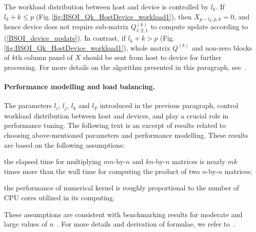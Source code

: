 \documentclass{llncs}
\begin{document}
The workload distribution between host and device is controlled by $l_k$. 
If $l_k + k \leq p$ (Fig.\,\ref{fig:BSOI_Qk_HostDevice_workload1}),
then $X_{p-l_k:p,k}=0$,
and hence device does not require sub-matrix $Q^{(k)}_{1:2,1}$
to compute update according to (\ref{BSOI_device_update}).
In contrast,
if $l_k + k > p$ (Fig.\,\ref{fig:BSOI_Qk_HostDevice_workload1}),
whole matrix $Q^{(k)}$ and non-zero blocks of $k$th column panel of $X$
should be sent from host to device for further processing.
For more details on the algorithm presented in this paragraph,
see~\cite{GogolenkoBai13}.



\paragraph{Performance modelling and load balancing.} \label{sec:load_balancing_parameters}

The parameters $l_i$, $l_j$, $l_k$ and $l_F$ 
introduced in the previous paragraph,
control workload distribution between host and devices, 
and play a crucial role in performance tuning.
The following text is an excerpt of results related to 
choosing above-mentioned parameters and performance modelling.
These results are based on the following assumptions: 
\begin{inparaenum}[(i)]
\item the elapsed time for 
  multiplying $mn$-by-$n$ and $kn$-by-$n$ matrices
  is nearly $mk$ times more than the wall time for computing the product
  of two $n$-by-$n$ matrices;
\item the performance of numerical kernel
  is roughly proportional to the number of CPU cores utilized in its computing.
\end{inparaenum}
These assumptions are consistent with benchmarking results 
for moderate and large values of $n$~\cite{GogolenkoBai13}.
For more details and derivation of formulae, we refer to~\cite{GogolenkoBai13}.
\end{document}
